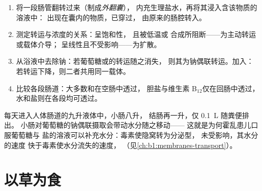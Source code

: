 \begin{method}[解读吸收实验]\label{met:b1:digestion-absorption:everted}
\begin{enumerate}
  \item 将一段肠管翻转过来（制成\emph{外翻囊}），
        内充生理盐水，再将其浸入含该物质的溶液中：
        出现在囊内的物质，已穿过，
        由原来的肠腔转入。
  \item 测定转运与浓度的关系：呈饱和性，
        且被低温或  合成所阻断——为主动转运或载体介导；
        呈线性且不受影响——为扩散。
  \item 从浴液中去除钠：若葡萄糖或的转运随之消失，
        则其为钠偶联转运。加入：
        若转运下降，则二者共用同一载体。
  \item 比较各段肠道：大多数和在空肠中透过，
        胆盐与维生素 B$_{12}$仅在回肠中透过，
        水和盐则在各段均可透过。
\end{enumerate}
\end{method}

\begin{example}[水量收支]\label{ex:b1:digestion-absorption:water}
每天进入人体肠道的九升液体中，小肠八升，
结肠再一升，仅 \qty{0.1}{L} 随粪便排出。
小肠对葡萄糖的钠偶联摄取会带动水分随之移动——
这就是为何霍乱患儿口服葡萄糖与
盐的溶液可以补充水分：毒素使隐窝转为分泌型，
未受影响，其水分的速度
快于毒素使水分流失的速度，
（见\cref{ch:b1:membranes-transport}）。
\end{example}

\section{以草为食}


